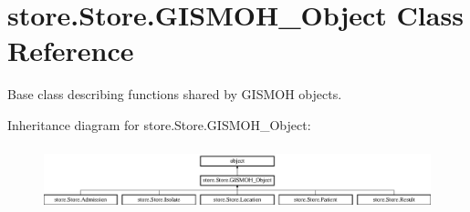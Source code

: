 \hypertarget{classstore_1_1_store_1_1_g_i_s_m_o_h___object}{\section{store.\-Store.\-G\-I\-S\-M\-O\-H\-\_\-\-Object Class Reference}
\label{classstore_1_1_store_1_1_g_i_s_m_o_h___object}
}


Base class describing functions shared by G\-I\-S\-M\-O\-H objects.  


Inheritance diagram for store.\-Store.\-G\-I\-S\-M\-O\-H\-\_\-\-Object\-:\begin{figure}[H]
\begin{center}
\leavevmode
\includegraphics[height=1.866667cm]{classstore_1_1_store_1_1_g_i_s_m_o_h___object}
\end{center}
\end{figure}

